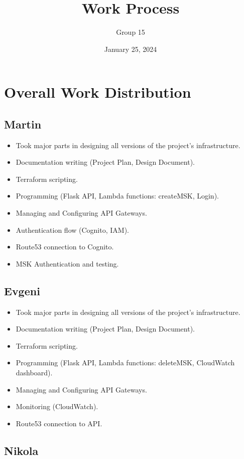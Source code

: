 \documentclass[10pt, a4paper]{article}
\title{Work Process}
\author{Group 15}
\date{January 25, 2024}
\begin{document}
\maketitle
\tableofcontents

\section{Overall Work Distribution}
\subsection{Martin}
\begin{itemize}
	\item Took major parts in designing all versions of the project's infrastructure.
	\item Documentation writing (Project Plan, Design Document).
	\item Terraform scripting.
	\item Programming (Flask API, Lambda functions: createMSK, Login).
	\item Managing and Configuring API Gateways.
	\item Authentication flow (Cognito, IAM).
	\item Route53 connection to Cognito.
	\item MSK Authentication and testing.

\end{itemize}

\subsection{Evgeni}
\begin{itemize}
	\item Took major parts in designing all versions of the project's infrastructure.
	\item Documentation writing (Project Plan, Design Document).
	\item Terraform scripting.
	\item Programming (Flask API, Lambda functions: deleteMSK, CloudWatch dashboard).
	\item Managing and Configuring API Gateways.
	\item Monitoring (CloudWatch).
	\item Route53 connection to API.
\end{itemize}

\subsection{Nikola}
\end{document}
